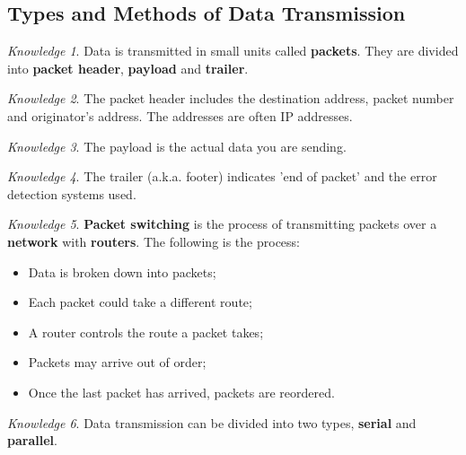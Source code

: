 \documentclass[8pt]{article}
\theoremstyle{remark}
\newtheorem{knowledge}{Knowledge}[subsection]
\begin{document}
        \subsection{Types and Methods of Data Transmission}    

        \begin{knowledge}
            Data is transmitted in small units called \textbf{packets}. They are divided into \textbf{packet header}, \textbf{payload} and \textbf{trailer}.
        \end{knowledge}
        
        \begin{knowledge}
            The packet header includes the destination address, packet number and originator's address. The addresses are often IP addresses.
        \end{knowledge}

        \begin{knowledge}
            The payload is the actual data you are sending.
        \end{knowledge}

        \begin{knowledge}
            The trailer (a.k.a. footer) indicates 'end of packet' and the error detection systems used.
        \end{knowledge}

        \begin{knowledge}
            \textbf{Packet switching} is the process of transmitting packets over a \textbf{network} with \textbf{routers}. The following is the process:
            \begin{itemize}
                \item Data is broken down into packets;
                \item Each packet could take a different route;
                \item A router controls the route a packet takes;
                \item Packets may arrive out of order;
                \item Once the last packet has arrived, packets are reordered.
            \end{itemize}
        \end{knowledge}

        \begin{knowledge}
            Data transmission can be divided into two types, \textbf{serial} and \textbf{parallel}.
        \end{knowledge}
\end{document}
